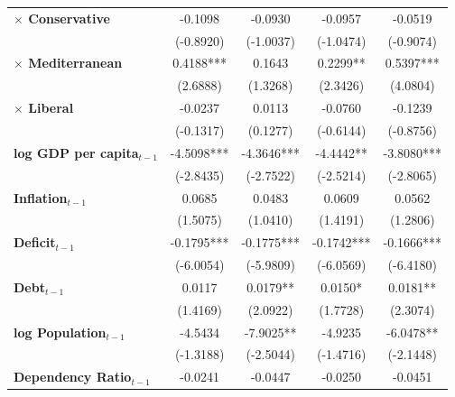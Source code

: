 \begin{center}
\begin{tabular}{lcccc}
\textbf{$\times$ Conservative}         &    -0.1098     &     -0.0930      &     -0.0957      &     -0.0519       \\
\textbf{ }                         &   (-0.8920)    &    (-1.0037)     &    (-1.0474)     &    (-0.9074)      \\
\textbf{$\times$ Mediterranean}        &   0.4188***    &      0.1643      &     0.2299**     &    0.5397***      \\
\textbf{ }                         &    (2.6888)    &     (1.3268)     &     (2.3426)     &     (4.0804)      \\
\textbf{$\times$ Liberal}              &    -0.0237     &      0.0113      &     -0.0760      &     -0.1239       \\
\textbf{ }                         &   (-0.1317)    &     (0.1277)     &    (-0.6144)     &    (-0.8756)      \\
\textbf{log GDP per capita$_{t-1}$}           &   -4.5098***   &    -4.3646***    &    -4.4442**     &    -3.8080***     \\
\textbf{ }                         &   (-2.8435)    &    (-2.7522)     &    (-2.5214)     &    (-2.8065)      \\
\textbf{Inflation$_{t-1}$}      &     0.0685     &      0.0483      &      0.0609      &      0.0562       \\
\textbf{ }                         &    (1.5075)    &     (1.0410)     &     (1.4191)     &     (1.2806)      \\
\textbf{Deficit$_{t-1}$}             &   -0.1795***   &    -0.1775***    &    -0.1742***    &    -0.1666***     \\
\textbf{ }                         &   (-6.0054)    &    (-5.9809)     &    (-6.0569)     &    (-6.4180)      \\
\textbf{Debt$_{t-1}$}                &     0.0117     &     0.0179**     &     0.0150*      &     0.0181**      \\
\textbf{ }                         &    (1.4169)    &     (2.0922)     &     (1.7728)     &     (2.3074)      \\
\textbf{log Population$_{t-1}$}      &    -4.5434     &    -7.9025**     &     -4.9235      &    -6.0478**      \\
\textbf{ }                         &   (-1.3188)    &    (-2.5044)     &    (-1.4716)     &    (-2.1448)      \\
\textbf{Dependency Ratio$_{t-1}$}   &    -0.0241     &     -0.0447      &     -0.0250      &     -0.0451       \\

\end{tabular}
\end{center}
